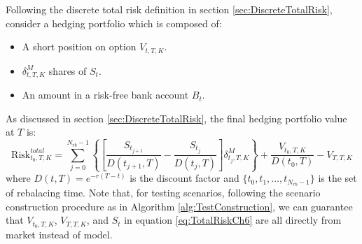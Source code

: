 \documentclass[letterpaper,12pt,titlepage,oneside,final]{book}
\numberwithin{equation}{section}
\theoremstyle{definition}
\newcommand{\DT}{\Delta t}
\newcommand{\Vmkt}{V^{mkt}}
\newcommand{\Smkt}{S}
\begin{document}
Following the discrete total risk definition in section \ref{sec:DiscreteTotalRisk}, consider a hedging portfolio  which is composed of:
\begin{itemize}
	\item A short position on option $V_{t,T,K}$.
	\item $\delta^{M}_{t,T,K}$ shares of $\Smkt_t$. 
	\item An amount in a risk-free bank account $B_t$.
\end{itemize}
As discussed in section \ref{sec:DiscreteTotalRisk}, the final hedging portfolio value at $T$ is:
\begin{equation}
\text{Risk}^{total}_{t_0,T,K}=\sum_{j=0}^{N_{rb}-1}\left\{ \left[\frac{\Smkt_{t_{j+1}}}{D(t_{j+1},T)}-\frac{\Smkt_{t_{j}}}{D(t_{j},T)}\right] \delta^M_{t_j,T,K} \right\}+\frac{V_{t_0,T,K}}{D(t_{0},T)}-V_{T,T,K}
\label{eq:TotalRiskCh6}
\end{equation}
where
$D(t,T)=e^{-r(T-t)}$ is the discount factor and $\{t_0,t_1, \dots, t_{N_{rb}-1}\}$ is the set of rebalacing time. Note that, for testing scenarios, following the scenario construction procedure as in Algorithm \ref{alg:TestConstruction}, we can guarantee that $V_{t_0,T,K}$, $V_{T,T,K}$, and $\Smkt_t$ in equation \eqref{eq:TotalRiskCh6} are all directly from market instead of model.
\end{document}
